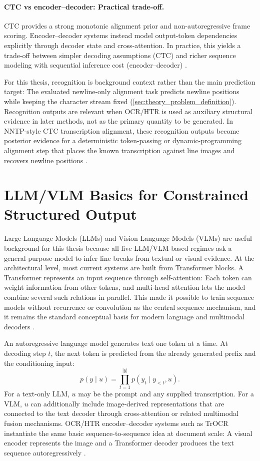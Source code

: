 \paragraph{CTC vs encoder--decoder: Practical trade-off.}
CTC provides a strong monotonic alignment prior and non-autoregressive frame scoring. Encoder--decoder systems instead model output-token dependencies explicitly through decoder state and cross-attention. In practice, this yields a trade-off between simpler decoding assumptions (CTC) and richer sequence modeling with sequential inference cost (encoder--decoder) .

For this thesis, recognition is background context rather than the main prediction target: The evaluated newline-only alignment task predicts newline positions while keeping the character stream fixed (\autoref{sec:theory_problem_definition}). Recognition outputs are relevant when OCR/HTR is used as auxiliary structural evidence in later methods, not as the primary quantity to be generated. In NNTP-style CTC transcription alignment, these recognition outputs become posterior evidence for a deterministic token-passing or dynamic-programming alignment step that places the known transcription against line images and recovers newline positions .

\section{LLM/VLM Basics for Constrained Structured Output}
\label{sec:theory_llm_vlm_structured_output}

Large Language Models (LLMs) and Vision-Language Models (VLMs) are useful background for this thesis because all five LLM/VLM-based regimes ask a general-purpose model to infer line breaks from textual or visual evidence. At the architectural level, most current systems are built from Transformer blocks. A Transformer represents an input sequence through self-attention: Each token can weight information from other tokens, and multi-head attention lets the model combine several such relations in parallel. This made it possible to train sequence models without recurrence or convolution as the central sequence mechanism, and it remains the standard conceptual basis for modern language and multimodal decoders .

An autoregressive language model generates text one token at a time. At decoding step \(t\), the next token is predicted from the already generated prefix and the conditioning input:
\[
p(y\mid u)=\prod_{t=1}^{|y|}p(y_t\mid y_{<t},u).
\]
For a text-only LLM, \(u\) may be the prompt and any supplied transcription. For a VLM, \(u\) can additionally include image-derived representations that are connected to the text decoder through cross-attention or related multimodal fusion mechanisms. OCR/HTR encoder--decoder systems such as TrOCR instantiate the same basic sequence-to-sequence idea at document scale: A visual encoder represents the image and a Transformer decoder produces the text sequence autoregressively .

